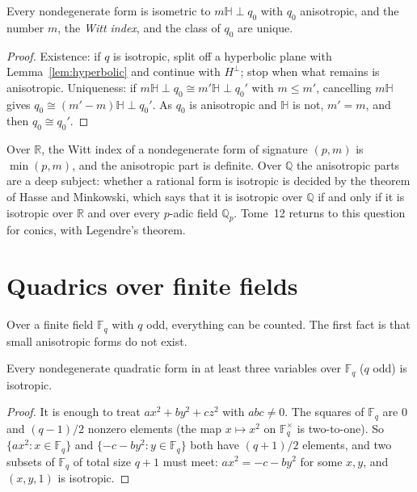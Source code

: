 \begin{corollary}\label{cor:wittindex}
Every nondegenerate form is isometric to $m\mathbb H\perp q_0$ with $q_0$ anisotropic, and the number $m$, the \emph{Witt index}, and the class of $q_0$
are unique.
\end{corollary}

\begin{proof}
Existence: if $q$ is isotropic, split off a hyperbolic plane with Lemma~\ref{lem:hyperbolic} and continue with $H^\perp$; stop when what remains is
anisotropic. Uniqueness: if $m\mathbb H\perp q_0\cong m'\mathbb H\perp q_0'$ with $m\le m'$, cancelling $m\mathbb H$ gives $q_0\cong(m'-m)\mathbb H\perp q_0'$.
As $q_0$ is anisotropic and $\mathbb H$ is not, $m'=m$, and then $q_0\cong q_0'$.
\end{proof}

Over $\mathbb R$, the Witt index of a nondegenerate form of signature $(p,m)$ is $\min(p,m)$, and the anisotropic part is definite. Over
$\mathbb Q$ the anisotropic parts are a deep subject: whether a rational form is isotropic is decided by the theorem of Hasse and Minkowski, which says
that it is isotropic over $\mathbb Q$ if and only if it is isotropic over $\mathbb R$ and over every $p$-adic field $\mathbb Q_p$. Tome~12 returns to
this question for conics, with Legendre's theorem.

\section{Quadrics over finite fields}

Over a finite field $\mathbb F_q$ with $q$ odd, everything can be counted. The first fact is that small anisotropic forms do not exist.

\begin{proposition}\label{prop:chevalley}
Every nondegenerate quadratic form in at least three variables over $\mathbb F_q$ ($q$ odd) is isotropic.
\end{proposition}

\begin{proof}
It is enough to treat $ax^2+by^2+cz^2$ with $abc\ne0$. The squares of $\mathbb F_q$ are $0$ and $(q-1)/2$ nonzero elements (the map $x\mapsto x^2$ on
$\mathbb F_q^\times$ is two-to-one). So $\{ax^2:x\in\mathbb F_q\}$ and $\{-c-by^2:y\in\mathbb F_q\}$ both have $(q+1)/2$ elements, and two subsets of
$\mathbb F_q$ of total size $q+1$ must meet: $ax^2=-c-by^2$ for some $x,y$, and $(x,y,1)$ is isotropic.
\end{proof}

